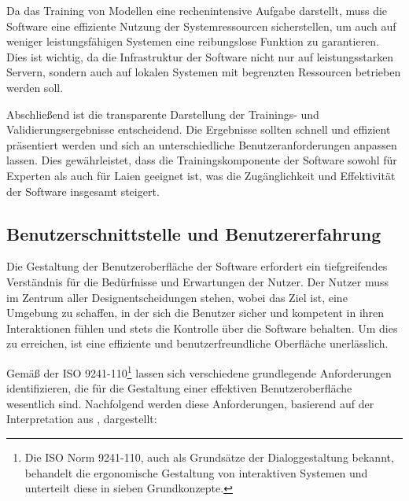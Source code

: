 Da das Training von Modellen eine rechenintensive Aufgabe darstellt, muss die Software eine effiziente Nutzung der Systemressourcen sicherstellen, um auch auf weniger leistungsfähigen Systemen eine reibungslose Funktion zu garantieren.
Dies ist wichtig, da die Infrastruktur der Software nicht nur auf leistungsstarken Servern, sondern auch auf lokalen Systemen mit begrenzten Ressourcen betrieben werden soll.

Abschließend ist die transparente Darstellung der Trainings- und Validierungsergebnisse entscheidend. Die Ergebnisse sollten schnell und effizient präsentiert werden und sich an unterschiedliche Benutzeranforderungen anpassen lassen. 
Dies gewährleistet, dass die Trainingskomponente der Software sowohl für Experten als auch für Laien geeignet ist, was die Zugänglichkeit und Effektivität der Software insgesamt steigert.


\subsection{Benutzerschnittstelle und Benutzererfahrung}
\label{cha:Anforderungsanalyse:Usability}

Die Gestaltung der Benutzeroberfläche der Software erfordert ein tiefgreifendes Verständnis für die Bedürfnisse und Erwartungen der Nutzer. 
Der Nutzer muss im Zentrum aller Designentscheidungen stehen, wobei das Ziel ist, eine Umgebung zu schaffen, in der sich die Benutzer sicher und kompetent in ihren Interaktionen fühlen und stets die Kontrolle über die Software behalten. 
Um dies zu erreichen, ist eine effiziente und benutzerfreundliche Oberfläche unerlässlich.

Gemäß der ISO 9241-110\footnote{Die ISO Norm 9241-110, auch als Grundsätze der Dialoggestaltung bekannt, behandelt die ergonomische Gestaltung von interaktiven Systemen und unterteilt diese in sieben Grundkonzepte.} lassen sich 
verschiedene grundlegende Anforderungen identifizieren, die für die Gestaltung einer effektiven Benutzeroberfläche wesentlich sind. Nachfolgend werden diese Anforderungen, basierend auf der Interpretation aus \cite{DieGrund14:online}, dargestellt:

